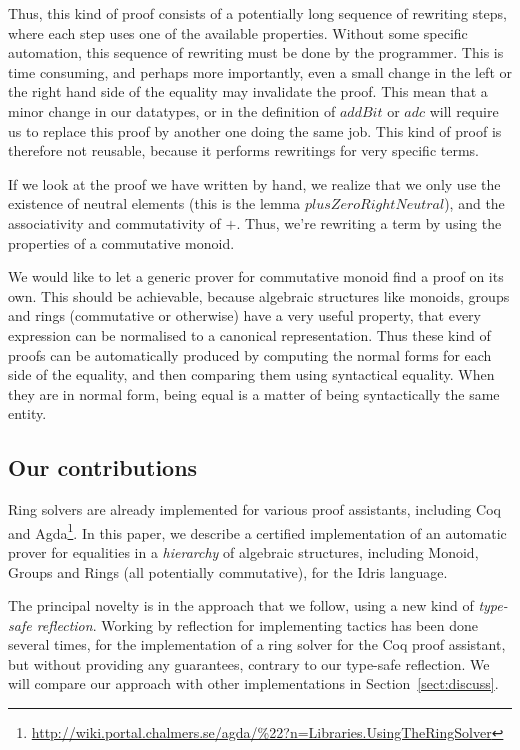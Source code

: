 Thus, this kind of proof consists of a potentially long sequence of rewriting
steps,
where each step uses one of the available properties. Without some
specific automation, this sequence of rewriting must be done by the programmer.
This is time consuming, and perhaps more importantly, even a small
change in the left
or the right hand side of the equality may invalidate the proof.
This mean that a minor change in our
datatypes, or in the definition of $addBit$ or $adc$ will require us to
replace this proof by another one doing the same job.
This kind
of proof is therefore not reusable, because it performs rewritings for
very specific terms.

If we look at the proof we have written by hand, we realize that we only use
the existence of neutral elements (this is the lemma $plusZeroRightNeutral$),
and the associativity and commutativity of $+$. Thus, we're rewriting a term by
using the properties of a commutative monoid.

We would like to let a generic prover for commutative monoid find a proof on its own.
This should be achievable, because algebraic structures like monoids, groups and
rings (commutative or otherwise) have a very useful property, that
every expression can be normalised to a canonical representation. Thus
these kind of proofs can be automatically produced by computing the
normal forms for each side of the equality, and then comparing them using
syntactical equality. When they are in normal
form, being equal is a matter of being syntactically the same entity.

\subsection{Our contributions}

Ring solvers are already implemented for various proof
assistants, including Coq~\cite{Coq2005} and Agda\footnote{\url{http://wiki.portal.chalmers.se/agda/\%22?n=Libraries.UsingTheRingSolver}}. 
In this paper, we describe a certified
implementation of an automatic prover for equalities in a
\emph{hierarchy} of algebraic
structures, including Monoid, Groups and Rings (all potentially commutative),
for the Idris language. 

The principal novelty is in the approach that we follow, using a
new kind of \emph{type-safe reflection}.  Working by reflection for implementing
tactics has been done several times, for the implementation of a
ring solver for the Coq proof assistant, but without
providing any guarantees, contrary to our type-safe reflection. We will
compare our approach with other implementations in Section~\ref{sect:discuss}.

